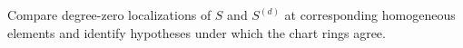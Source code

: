 \begin{problem}\label{chal:vi34-02}
Compare degree-zero localizations of \(S\) and \(S^{(d)}\) at corresponding homogeneous elements and identify hypotheses under which the chart rings agree.
\end{problem}
